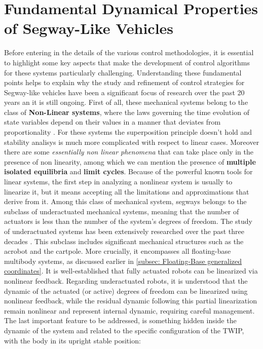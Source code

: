 \section{Fundamental Dynamical Properties of Segway-Like Vehicles}
\label{sec:Fundamental Dynamical Properties of Segway-Like Vehicles}

Before entering in the details of the various control methodologies, it is essential to highlight some key aspects that make the development of control algorithms for these systems particularly challenging. Understanding these fundamental points helps to explain why the study and refinement of control strategies for Segway-like vehicles have been a significant focus of research over the past 20 years an it is still ongoing.
First of all, these mechanical systems belong to the class of \textbf{Non-Linear systems}, where the laws governing the time evolution of state variables depend on their values in a manner that deviates from proportionality \cite{Khalil-2002}.
For these systems the superposition principle doesn't hold and stability analisys is much more complicated with respect to linear cases.
Moreover there are some \textit{essentially non linear phenomena} that can take place only in the presence of non linearity, among which we can mention the presence of \textbf{multiple isolated equilibria} and \textbf{limit cycles}.
Because of the powerful known tools for linear systems, the first step in analyzing a nonlinear system is usually to linearize it, but it means accepting all the limitations and approximations that derive from it.
Among this class of mechanical system, segways belongs to the subclass of underactuated mechanical systems, meaning that the number of actuators is less than the number of the system's degrees of freedom.
The study of underactuated systems has been extensively researched over the past three decades \cite{underactuated, spong2020robot}. This subclass includes significant mechanical structures such as the acrobot and the cartpole. More crucially, it encompasses all floating-base multibody systems, as discussed earlier in \cref{subsec: Floating-Base generalized coordinates}.
It is well-established \cite{Spong-underactuated} that fully actuated robots can be linearized via nonlinear feedback. Regarding underactuated robots, it is understood that the dynamic of the actuated (or active) degrees of freedom can be linearized using nonlinear feedback, while the residual dynamic following this partial linearization remain nonlinear and represent internal dynamic, requiring careful management.
The last important feature to be addressed, is something hidden inside the dynamic of the system and related to the specific configuration of the TWIP, with the body in its upright stable position:
